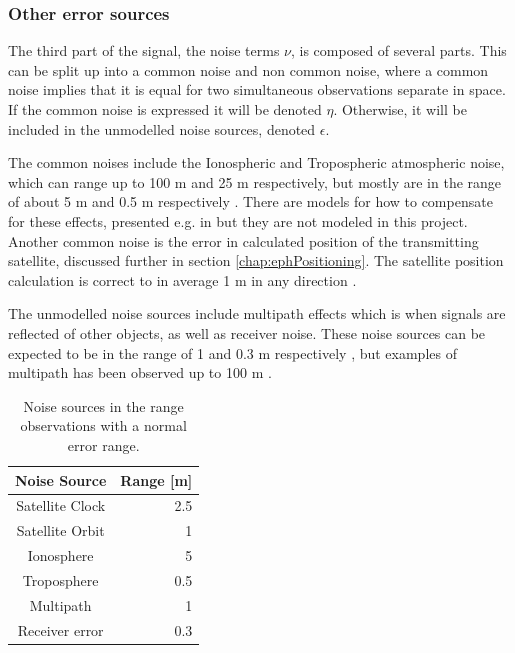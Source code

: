 \subsubsection{Other error sources}\label{errorSources}
The third part of the signal, the noise terms $\nu$, is composed of several parts. This can be split up into a common noise and non common noise, where a common noise implies that it is equal for two simultaneous observations separate in space. If the common noise is expressed it will be denoted $\eta$. Otherwise, it will be included in the unmodelled noise sources, denoted $\epsilon$.
\par
The common noises include the Ionospheric and Tropospheric atmospheric noise, which can range up to 100 m \cite{IonoNoise} and 25 m \cite{williams2017tropospheric} respectively, but mostly are in the range of about 5 m and 0.5 m respectively \cite{Jeffrey}. There are models for how to compensate for these effects, presented e.g. in \cite{Karaim2018Chapter4G} but they are not modeled in this project. Another common noise is the error in calculated position of the transmitting satellite, discussed further in section \ref{chap:ephPositioning}. The satellite position calculation is correct to in average 1 m in any direction \cite{satPos}.
\par 
The unmodelled noise sources include multipath effects which is when signals are reflected of other objects, as well as receiver noise. These noise sources can be expected to be in the range of 1 and 0.3 m respectively \cite{Jeffrey}, but examples of multipath has been observed up to 100 m \cite{Karaim2018Chapter4G}.  

\begin{table}[h!]
  \begin{center}
    \begin{tabular}{|c|r|}\hline
		\textbf{Noise Source}& \textbf{Range} [m] \\      \hline
      	Satellite Clock & 	2.5 \\ \hline
		Satellite Orbit & 	1 \\ \hline
		Ionosphere & 		5 \\ \hline
		Troposphere&		0.5\\ \hline
		Multipath &			1 \\ \hline
		Receiver error & 	0.3 \\ \hline
    \end{tabular}
    \caption{\label{tableNoise} Noise sources in the range observations with a normal error range.}
  \end{center}
\end{table}

